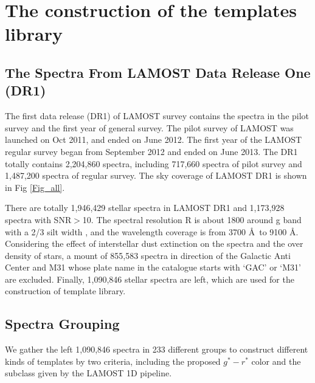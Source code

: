 \documentclass[manuscript]{aastex}
\begin{document}
\section{The construction of the templates library}
\label{sect:construction}
\subsection{The Spectra From LAMOST Data Release One (DR1)}
The first data release (DR1) of LAMOST survey contains the spectra in the pilot survey and the first year of general survey.
The pilot survey of LAMOST  was launched on Oct 2011, and ended on June 2012.%
The first year of the LAMOST regular survey began from September 2012 and ended on June 2013.
The DR1 totally contains 2,204,860 spectra, including 717,660 spectra of pilot survey and 1,487,200 spectra of regular survey.
The sky coverage of LAMOST DR1 is shown in Fig \ref{Fig_all}.

There are totally 1,946,429 stellar spectra in LAMOST DR1 and 1,173,928 spectra with SNR$>$10.
The spectral resolution R is about 1800 around g band with a 2/3 silt width  \citep{wang2013effects},
and the wavelength coverage is from 3700 \AA\  to 9100 \AA.
Considering the  effect of interstellar dust  extinction on the spectra and the over density of stars,
a mount of 855,583 spectra in direction of the Galactic Anti Center and M31\citep{liu2013lss} whose plate name in the catalogue starts with `GAC' or `M31' are excluded.
Finally,  1,090,846 stellar spectra are left,
which are used for the construction of template library.


\subsection{Spectra Grouping}
We gather the left 1,090,846 spectra in 233 different groups to construct different kinds of templates by two criteria,
including the proposed $g^*-r^*$ color and the subclass given by the LAMOST 1D pipeline.
\end{document}
